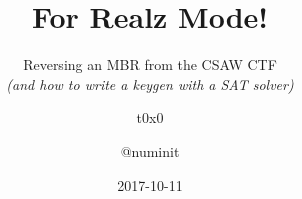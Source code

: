 \documentclass{beamer}
\title{For Realz Mode!}
\subtitle{
    Reversing an MBR from the CSAW CTF\\
    {\em (and how to write a keygen with a SAT solver)}
}
\author{t0x0 \and @numinit}
\institute{\VaporSec}
\date{2017-10-11}
\begin{document}
\begin{frame}
    \titlepage
\end{frame}



\end{document}
